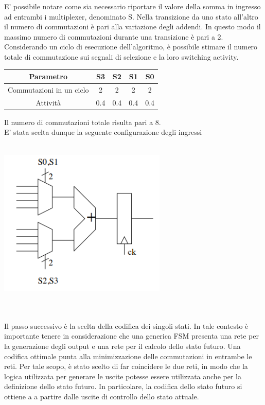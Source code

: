 \documentclass[11pt,  english, makeidx, a4paper, titlepage, oneside]{book}
\begin{document}
\vspace{0.3cm}     
E' possibile notare come sia necessario riportare il valore della somma in ingresso ad entrambi i multiplexer, denominato S. Nella transizione da uno stato all'altro il numero di commutazioni è pari alla variazione degli addendi. In questo modo il massimo numero di commutazioni durante una transizione è pari a 2.\\
Considerando un ciclo di esecuzione dell'algoritmo, è possibile stimare il numero totale di commutazione sui segnali di selezione e la loro switching activity.\\
\begin{center}
	\begin{tabular}{|c|c|c|c|c|}
	\hline
	Parametro & S3 & S2 & S1 & S0 \\ 
	\hline
	Commutazioni in un ciclo & 2 & 2 & 2 & 2 \\
	\hline
	Attività & 0.4 & 0.4 & 0.4 & 0.4  \\
	\hline
	\end{tabular}	
\end{center}
\vspace{0.3cm}  
Il numero di commutazioni totale risulta pari a 8.\\
E' stata scelta dunque la seguente configurazione degli ingressi 
\\\\
\centerline{\includegraphics[width=8cm]{./img/Lab_2/Datapath.png}}
\\\\  
Il passo successivo è la scelta della codifica dei singoli stati. In tale contesto è importante tenere in considerazione che una generica FSM presenta una rete per la generazione degli output e una rete per il calcolo dello stato futuro. Una codifica ottimale punta alla minimizzazione delle commutazioni in entrambe le reti. Per tale scopo, è stato scelto di far coincidere le due reti, in modo che la logica utilizzata per generare le uscite potesse essere utilizzata anche per la definizione dello stato futuro. In particolare, la codifica dello stato futuro si ottiene a a partire dalle uscite di controllo dello stato attuale.
\end{document}
